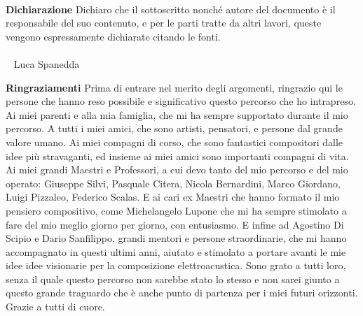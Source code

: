 \documentclass[12pt]{article}
\begin{document}


\newpage
\
\newpage

\vfill
\LARGE \textbf{Dichiarazione} \normalsize \newline \newline
Dichiaro che il sottoscritto nonché autore del
documento è il responsabile del suo contenuto,
e per le parti tratte da altri lavori,
queste vengono espressamente dichiarate
citando le fonti. \\  \\
\
\hspace*{\fill} \large Luca Spanedda \normalsize
\
\newpage

\vfill
\LARGE \textbf{Ringraziamenti} \normalsize \newline \newline
Prima di entrare nel merito degli argomenti, ringrazio qui le persone
che hanno reso possibile e significativo questo percorso che ho intrapreso.
Ai miei parenti e alla mia famiglia, che mi ha sempre supportato durante il
mio percorso.
A tutti i miei amici, che sono artisti, pensatori, e persone dal grande valore umano.
Ai miei compagni di corso, che sono fantastici compositori dalle idee più stravaganti,
ed insieme ai miei amici sono importanti compagni di vita.
Ai miei grandi Maestri e Professori, a cui devo tanto del mio percorso e del mio operato:
Giuseppe Silvi, Pasquale Citera, Nicola Bernardini, Marco Giordano, Luigi Pizzaleo, Federico Scalas.
E ai cari ex Maestri che hanno formato il mio pensiero compositivo,
come Michelangelo Lupone che mi ha sempre stimolato a fare del mio meglio giorno per giorno,
con entusiasmo.
E infine ad Agostino Di Scipio e Dario Sanfilippo, grandi mentori e persone straordinarie,
che mi hanno accompagnato in questi ultimi anni, aiutato e stimolato a portare avanti le
mie idee idee visionarie per la composizione elettroacustica.
Sono grato a tutti loro, senza il quale questo percorso non sarebbe stato lo stesso
e non sarei giunto a questo grande traguardo che è anche punto di partenza per i miei futuri
orizzonti.
Grazie a tutti di cuore.
\newpage
\
\newpage
\end{document}
